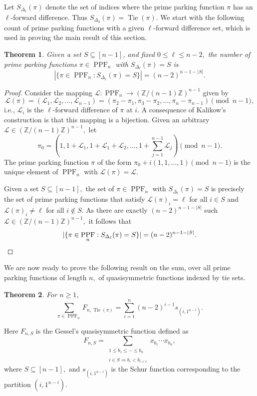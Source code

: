 \documentclass[12pt,reqno]{amsart}
\newtheorem{theorem}{Theorem}[section]
\theoremstyle{definition}
\theoremstyle{remark}
\newcommand{\SetL}[1]{S_{\Delta_{#1}}}
\newcommand{\mL}{\mathcal{L}}
\DeclareMathOperator{\PPF}{PPF}
\DeclareMathOperator{\Tie}{Tie}
\begin{document}
Let $\SetL{\ell}(\pi)$ denote the set of indices where the prime parking function $\pi$ has an $\ell$-forward difference.  Thus $\SetL{0}(\pi)=\Tie(\pi).$  We start with the following count of prime parking functions with a given $\ell$-forward difference set, which is used in proving the main result of this section.

\begin{theorem}\label{thm:Tie_Set_count}
    Given a set $S\subseteq[n-1]$, and fixed $0\leq \ell\leq n-2,$ the number of prime parking functions $\pi\in\PPF_n$ with $\SetL{\ell}(\pi)=S$ is  
    $$|\{\pi \in \PPF_n : \SetL{\ell}(\pi)=S\}| =(n-2)^{n-1-|S|}.$$
\end{theorem}

\begin{proof} 
Consider the mapping $\mL:\PPF_n\rightarrow \left(\mathbb{Z}/(n-1)\mathbb{Z}\right)^{n-1}$ given by 
\[\mL(\pi)=(\mL_1,\mL_2,\ldots,\mL_{n-1})=(\pi_2-\pi_1, \pi_3-\pi_2,\ldots,\pi_n-\pi_{n-1})\pmod{n-1},\] i.e., $\mL_i$ is the $\ell$-forward difference of $\pi$ at $i.$ A consequence of Kalikow's construction is that this mapping is a bijection.  
Given an arbitrary $\mathcal{L}\in \left(\mathbb{Z}/(n-1)\mathbb{Z}\right)^{n-1},$ let \[\pi_0=(1,1+\mL_1,1+\mL_1+\mL_2,\ldots,1+\sum_{j=1}^{n-1}\mL_j)\pmod{n-1}.\]  The prime parking function $\pi$ of the form $\pi_0+i(1,1,\ldots,1)\pmod{n-1}$ is the unique element of $\PPF_n$ with $\mathcal{L}(\pi)=\mL.$

Given a set $S\subseteq [n-1],$ the set of $\pi\in\PPF_n$ with $\SetL{\ell}(\pi)=S$ is precisely the set of prime parking functions that satisfy $\mL(\pi)_i=\ell$ for all $i\in S$ and $\mL(\pi)_i\not=\ell$ for all $i\not\in S.$  As there are exactly $(n-2)^{n-1-|S|}$ such $\mL\in \left(\mathbb{Z}/(n-1)\mathbb{Z}\right)^{n-1},$ it follows that \[|\{\pi \in \PPF_n : \SetL{\ell}(\pi)=S\}| =(n-2)^{n-1-|S|}.\qedhere\]
\end{proof}


We are now ready to prove the following result on the sum, over all prime parking functions of length $n,$ of quasisymmetric functions indexed by tie sets. 

\begin{theorem}\label{thm:quasisym}
For $n\geq 1$,
\begin{equation*}
\sum_{\pi\in\PPF_n}F_{n,\Tie(\pi)} =\sum_{i=1}^n (n-2)^{i-1}s_{(i,1^{n-i})}.
\end{equation*}
\end{theorem}
\noindent Here $F_{n,S}$ is the Gessel's quasisymmetric function defined as
\[F_{n,S}=
\sum_{\substack{1\leq b_1\leq \cdots\leq b_n \\ \\i\in S\Rightarrow b_i<b_{i+1}}} x_{b_1}\cdots x_{b_n},\]
where $S\subseteq[n-1],$ and $s_{(i,1^{n-i})}$ is the Schur function corresponding to the partition $(i,1^{n-i})$. 
\end{document}

